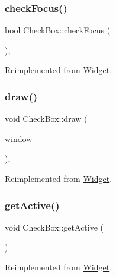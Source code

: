 \subsubsection{\texorpdfstring{checkFocus()}{checkFocus()}}
{\footnotesize\ttfamily bool Check\+Box\+::check\+Focus (\begin{DoxyParamCaption}{ }\end{DoxyParamCaption})\hspace{0.3cm}{\ttfamily [override]}, {\ttfamily [virtual]}}



Reimplemented from \mbox{\hyperlink{class_widget_ac8121758d9fcfedb4ff119abeb7d0652}{Widget}}.

\mbox{\label{class_check_box_ade6c518dbbed2d24f101af024b08495f}} 
\subsubsection{\texorpdfstring{draw()}{draw()}}
{\footnotesize\ttfamily void Check\+Box\+::draw (\begin{DoxyParamCaption}\item[{sf\+::\+Render\+Window \&}]{window }\end{DoxyParamCaption})\hspace{0.3cm}{\ttfamily [override]}, {\ttfamily [virtual]}}



Reimplemented from \mbox{\hyperlink{class_widget_ae33a60123dee736ad8ece7277711f3d4}{Widget}}.

\mbox{\label{class_check_box_a40948ae138e422b4b025c225e1c532b5}} 
\subsubsection{\texorpdfstring{getActive()}{getActive()}}
{\footnotesize\ttfamily void Check\+Box\+::get\+Active (\begin{DoxyParamCaption}{ }\end{DoxyParamCaption})\hspace{0.3cm}{\ttfamily [virtual]}}



Reimplemented from \mbox{\hyperlink{class_widget_a255e13ebf55d19f93a37b7a1aec9a87f}{Widget}}.

